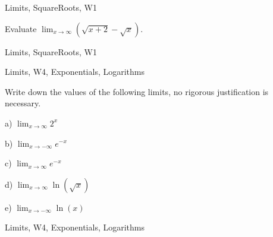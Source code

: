 \begin{tagblock}{Limits, SquareRoots, W1}
\begin{question}
	Evaluate $\displaystyle\lim_{x\to\infty}(\sqrt{x+2}-\sqrt{x})$.
	
	
\begin{tags}
	    Limits, SquareRoots, W1
\end{tags}
	
\begin{diary}
	    
\end{diary}
	
\begin{solution}
	  
\end{solution}
	
\end{question}

\end{tagblock}


\begin{tagblock}{Limits, W4, Exponentials, Logarithms}
\begin{question}
	Write down the values of the following limits, no rigorous justification is necessary.

\bigskip

a) $\displaystyle\lim_{x\to\infty}2^x$

\bigskip

b) $\displaystyle\lim_{x\to-\infty}e^{-x}$

\bigskip

c) $\displaystyle\lim_{x\to\infty}e^{-x}$

\bigskip

d) $\displaystyle\lim_{x\to\infty}\ln(\sqrt{x})$

\bigskip

e) $\displaystyle\lim_{x\to-\infty}\ln(x)$
	
	
\begin{tags}
	    Limits, W4, Exponentials, Logarithms
\end{tags}
	
\begin{diary}
	    
\end{diary}
	
\begin{solution}
	  
\end{solution}
	
\end{question}

\end{tagblock}

